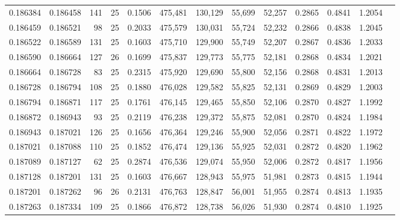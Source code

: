 \begin{tabular}{rrrrrrrrrrrrr}
0.186384 & 0.186458 &   141 &  25 &                                     0.1506 & 475,481 & 130,129 &  55,699 &  52,257 & 0.2865 & 0.4841 & 1.2054 \\
0.186459 & 0.186521 &    98 &  25 &                                     0.2033 & 475,579 & 130,031 &  55,724 &  52,232 & 0.2866 & 0.4838 & 1.2045 \\
0.186522 & 0.186589 &   131 &  25 &                                     0.1603 & 475,710 & 129,900 &  55,749 &  52,207 & 0.2867 & 0.4836 & 1.2033 \\
0.186590 & 0.186664 &   127 &  26 &                                     0.1699 & 475,837 & 129,773 &  55,775 &  52,181 & 0.2868 & 0.4834 & 1.2021 \\
0.186664 & 0.186728 &    83 &  25 &                                     0.2315 & 475,920 & 129,690 &  55,800 &  52,156 & 0.2868 & 0.4831 & 1.2013 \\
0.186728 & 0.186794 &   108 &  25 &                                     0.1880 & 476,028 & 129,582 &  55,825 &  52,131 & 0.2869 & 0.4829 & 1.2003 \\
0.186794 & 0.186871 &   117 &  25 &                                     0.1761 & 476,145 & 129,465 &  55,850 &  52,106 & 0.2870 & 0.4827 & 1.1992 \\
0.186872 & 0.186943 &    93 &  25 &                                     0.2119 & 476,238 & 129,372 &  55,875 &  52,081 & 0.2870 & 0.4824 & 1.1984 \\
0.186943 & 0.187021 &   126 &  25 &                                     0.1656 & 476,364 & 129,246 &  55,900 &  52,056 & 0.2871 & 0.4822 & 1.1972 \\
0.187021 & 0.187088 &   110 &  25 &                                     0.1852 & 476,474 & 129,136 &  55,925 &  52,031 & 0.2872 & 0.4820 & 1.1962 \\
0.187089 & 0.187127 &    62 &  25 &                                     0.2874 & 476,536 & 129,074 &  55,950 &  52,006 & 0.2872 & 0.4817 & 1.1956 \\
0.187128 & 0.187201 &   131 &  25 &                                     0.1603 & 476,667 & 128,943 &  55,975 &  51,981 & 0.2873 & 0.4815 & 1.1944 \\
0.187201 & 0.187262 &    96 &  26 &                                     0.2131 & 476,763 & 128,847 &  56,001 &  51,955 & 0.2874 & 0.4813 & 1.1935 \\
0.187263 & 0.187334 &   109 &  25 &                                     0.1866 & 476,872 & 128,738 &  56,026 &  51,930 & 0.2874 & 0.4810 & 1.1925 \\

\end{tabular}
